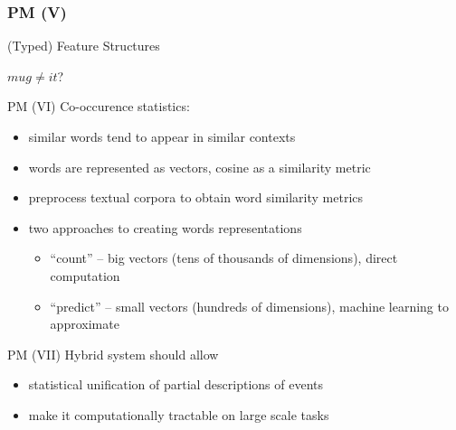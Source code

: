 \documentclass{beamer}
\begin{document}
\begin{frame}[fragile]
\frametitle{PM (V)}
(Typed) Feature Structures\\
\bigskip
\begin{center}
  \begin{avm}
  \end{avm}

\bigskip

  \begin{avm}
  \end{avm}  

\bigskip
  
  $mug \neq it$?
\end{center}
\end{frame}

\begin{frame}{PM (VI)}
Co-occurence statistics:\\
\bigskip
\begin{itemize}
    \item similar words tend to appear in similar contexts
    \item words are represented as vectors, cosine as a similarity metric
    \item preprocess textual corpora to obtain word similarity metrics
    \item two approaches to creating words representations
        \begin{itemize}
            \item ``count'' -- big vectors (tens of thousands of dimensions), direct computation
            \item ``predict'' -- small vectors (hundreds of dimensions), machine learning to approximate
        \end{itemize}
\end{itemize}
\end{frame}

\begin{frame}{PM (VII)}
Hybrid system should allow\\
\bigskip
\begin{itemize}
    \item statistical unification of partial descriptions of events
    \item make it computationally tractable on large scale tasks
\end{itemize}
\end{frame}
\end{document}

